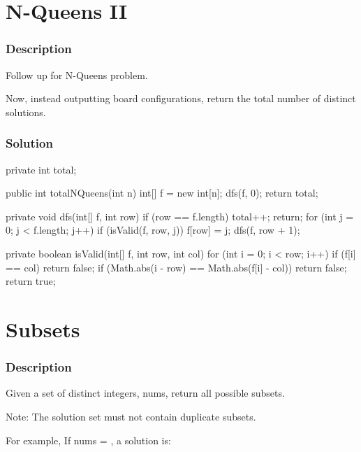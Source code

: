 \section{N-Queens II} %

\subsubsection{Description}

Follow up for N-Queens problem.

Now, instead outputting board configurations, return the total number of distinct solutions.

\subsubsection{Solution}

\begin{Code}
private int total;

public int totalNQueens(int n) {
    int[] f = new int[n];
    dfs(f, 0);
    return total;
}

private void dfs(int[] f, int row) {
    if (row == f.length) {
        total++;
        return;
    }
    for (int j = 0; j < f.length; j++) {
        if (isValid(f, row, j)) {
            f[row] = j;
            dfs(f, row + 1);
        }
    }
}

private boolean isValid(int[] f, int row, int col) {
    for (int i = 0; i < row; i++) {
        if (f[i] == col) {
            return false;
        }
        if (Math.abs(i - row) == Math.abs(f[i] - col)) {
            return false;
        }
    }
    return true;
}
\end{Code}

\newpage

\section{Subsets} %

\subsubsection{Description}

Given a set of distinct integers, nums, return all possible subsets.

Note: The solution set must not contain duplicate subsets.

For example,
If nums = \code{[1,2,3]}, a solution is:

